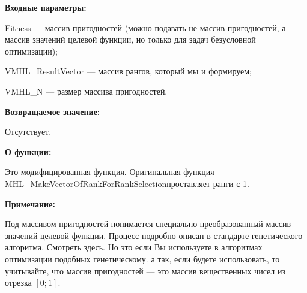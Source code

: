 \textbf{Входные параметры:}

 Fitness --- массив пригодностей (можно подавать не массив пригодностей, а массив значений целевой функции, но только для задач безусловной оптимизации);
 
 VMHL\_ResultVector --- массив рангов, который мы и формируем;
 
 VMHL\_N --- размер массива пригодностей.
 
\textbf{Возвращаемое значение:} 
 
Отсутствует.
 
\textbf{О функции:}

Это модифицированная функция. Оригинальная функция MHL\_MakeVectorOfRankForRankSelectionпроставляет ранги с 1.

\textbf{Примечание:}

 Под массивом пригодностей понимается специально преобразованный массив значений целевой функции. Процесс подробно описан в стандарте генетического алгоритма. Смотреть здесь. Но это если Вы используете в алгоритмах оптимизации подобных генетическому. а так, если будете использовать, то учитывайте, что массив пригодностей --- это массив вещественных чисел из отрезка $[0;1]$.
